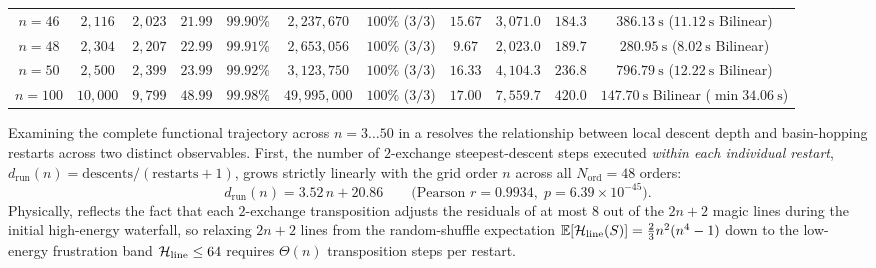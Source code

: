 \begin{table}[t]
{\begin{tabular}{@{}ccccccccccc@{}}
$n=46$  & $2{,}116$& $2{,}023$& $21.99$& $99.90\%$ & $2{,}237{,}670$& $100\%$ ($3/3$)   & $15.67$ & $3{,}071.0$& $184.3$ & $386.13~\text{s}$ ($11.12~\text{s}$ Bilinear) \\
$n=48$  & $2{,}304$& $2{,}207$& $22.99$& $99.91\%$ & $2{,}653{,}056$& $100\%$ ($3/3$)   & $9.67$  & $2{,}023.0$& $189.7$ & $280.95~\text{s}$ ($8.02~\text{s}$ Bilinear) \\
$n=50$  & $2{,}500$& $2{,}399$& $23.99$& $99.92\%$ & $3{,}123{,}750$& $100\%$ ($3/3$)   & $16.33$ & $4{,}104.3$& $236.8$ & $796.79~\text{s}$ ($12.22~\text{s}$ Bilinear) \\
\midrule
$n=100$ & $10{,}000$& $9{,}799$& $48.99$& $99.98\%$ & $49{,}995{,}000$& $100\%$ ($3/3$)  & $17.00$ & $7{,}559.7$& $420.0$ & $147.70~\text{s}$ Bilinear ($\min 34.06~\text{s}$) \\
\bottomrule
\end{tabular}%
}
\end{table}

Examining the complete functional trajectory across $n = 3\dots 50$ in a resolves the relationship between local descent depth and basin-hopping restarts across two distinct observables. First, the number of $2$-exchange steepest-descent steps executed \emph{within each individual restart}, $d_{\mathrm{run}}(n) = \text{descents} / (\text{restarts} + 1)$, grows strictly linearly with the grid order $n$ across all $N_{\mathrm{ord}} = 48$ orders:
\begin{equation}
  d_{\mathrm{run}}(n) = 3.52\,n + 20.86 \qquad \bigl(\text{Pearson } r = 0.9934,\; p = 6.39\times 10^{-45}\bigr).
  \label{eq:linear_descents_per_run}
\end{equation}
Physically,  reflects the fact that each $2$-exchange transposition adjusts the residuals of at most $8$ out of the $2n+2$ magic lines during the initial high-energy waterfall, so relaxing $2n+2$ lines from the random-shuffle expectation $\mathbb{E}[\mathcal{H}_{\mathrm{line}}(S)] = \frac{2}{3}n^2(n^4-1)$ down to the low-energy frustration band $\mathcal{H}_{\mathrm{line}} \le 64$ requires $\Theta(n)$ transposition steps per restart.

